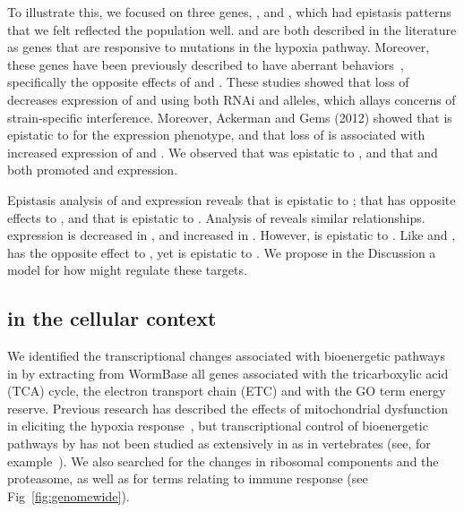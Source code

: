 To illustrate this, we focused on three genes, \nlp{}, \ftna{} and \ftnb{}, which had
epistasis patterns that we felt reflected the population well. \ftna{} and \ftnb{}
are both described in the literature as genes that are responsive to mutations in
the hypoxia pathway. Moreover, these genes have been previously described to have
aberrant behaviors~\citep{Ackerman2012,Romney2011}, specifically the
opposite effects of \egl{} and \vhl{}. These studies showed that loss of \vhl{}
decreases expression of \ftna{} and \ftnb{} using both RNAi and alleles, which
allays concerns of strain-specific interference. Moreover, Ackerman and Gems (2012)
showed that  is epistatic to  for the \ftna{}
expression phenotype, and that loss of
\hifp{} is associated with increased expression of \ftna{} and \ftnb{}. We observed
that  was epistatic to , and that  and
 both promoted \ftna{} and \ftnb{} expression.

Epistasis analysis of \ftna{} and \ftnb{} expression reveals that  is
epistatic to ; that  has opposite effects to ,
and that  is epistatic to . Analysis of \nlp{}
reveals similar relationships. \nlp{} expression is decreased in \hif{},
and increased in \egl{}. However,  is epistatic to .
Like \ftna{} and \ftnb{},  has the opposite effect to ,
yet is epistatic to . We propose in the Discussion a model for how
\hifp{} might regulate these targets.

\subsection*{\hifp{} in the cellular context}
\label{sub:metabolism}

We identified the transcriptional changes
associated with bioenergetic pathways in \cel{} by extracting from
WormBase all genes associated with the tricarboxylic acid (TCA) cycle, the
electron transport chain (ETC) and with the \cel{} GO term energy reserve.
Previous research has described the effects of mitochondrial dysfunction in
eliciting the hypoxia response~\citep{Lee2010}, but transcriptional control
of bioenergetic pathways by \hifp{} has not been studied as extensively in \cel{}
as in vertebrates (see, for example~\citep{Semenza1994,Semenza2012}).
We also searched for the changes in ribosomal components and the proteasome, as
well as for terms relating to immune response (see Fig~\ref{fig:genomewide}).

